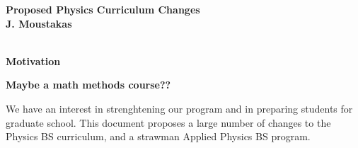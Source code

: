 \documentclass[12pt,preprint]{aastex}
\begin{document}
\vspace*{-1.2in} 
\begin{center}
{\Large {\bf\sc Proposed Physics Curriculum Changes}} \\
\vspace*{2mm} 
{\bf\sc J. Moustakas} \\
\vspace*{2mm} 
 \\
\vspace*{0.1in} 
\end{center}

{\large \sc \textbf{Motivation}}
\vspace{-1mm}

{\bf Maybe a math methods course??}

We have an interest in strenghtening our program and in preparing students for
graduate school.  This document proposes a large number of changes to the
Physics BS curriculum, and a strawman Applied Physics BS program.
\end{document}
